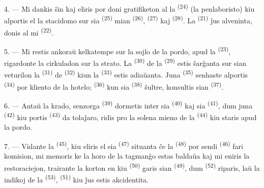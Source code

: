 4. --- Mi dankis ŝin kaj eliris por doni gratifiketon al la 
\textsuperscript{(24)} (la penlaboristo) kiu alportis el la stacidomo sur sia
 \textsuperscript{(25)} mian 
\textsuperscript{(26)},  \textsuperscript{(27)} kaj
 \textsuperscript{(28)}. La 
\textsuperscript{(21)} ĵus alveninta, donis al mi 
\textsuperscript{(22)}.

5. --- Mi restis ankoraŭ kelkatempe sur la sojlo de la pordo, apud la
 \textsuperscript{(23)}, rigardonte la cirkuladon sur la
strato. La  \textsuperscript{(30)} de la 
\textsuperscript{(29)} estis ŝarĝanta sur sian veturilon la 
\textsuperscript{(31)} de  \textsuperscript{(32)} kiun la
 \textsuperscript{(33)} estis adiaŭanta. Juna
 \textsuperscript{(35)} senhaste alportis
 \textsuperscript{(34)} por kliento de la hotelo;
 \textsuperscript{(36)} kun sia 
\textsuperscript{(38)} ŝultre, konsultis sian 
\textsuperscript{(37)}.

\VUsaut{4.0mm}
\VUsaut{3.0mm}

6. --- Antaŭ la krado, senzorga  \textsuperscript{(39)}
dormetis inter sia  \textsuperscript{(40)} kaj sia
 \textsuperscript{(41)}, dum juna 
\textsuperscript{(42)} kiu portis  \textsuperscript{(43)} da
tolaĵaro, ridis pro la solena mieno de la 
\textsuperscript{(44)} kiu staris apud la pordo.

7. --- Vidante la  \textsuperscript{(45)}, kiu eliris el sia
 \textsuperscript{(47)} situanta ĉe la 
\textsuperscript{(48)} por sendi  \textsuperscript{(46)} fari
komision, mi memoris ke la horo de la tagmanĝo estas baldaŭa kaj mi eniris la
restoraciejon, trairante la korton en kiu 
\textsuperscript{(50)} garis sian  \textsuperscript{(49)},
dum  \textsuperscript{(52)} riparis, laŭ la indikoj de la
 \textsuperscript{(53)}, 
\textsuperscript{(51)} kiu ĵus estis akcidentita.

